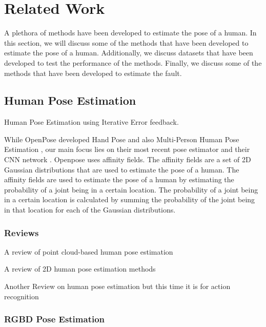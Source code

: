 \section{Related Work}
\label{sec:related_work}

A plethora of methods have been developed to estimate the pose of a human. In this section, we will discuss some of the methods that have been developed to estimate the pose of a human. Additionally, we discuss datasets that have been developed to test the performance of the methods. Finally, we discuss some of the methods that have been developed to estimate the fault.

\subsection{Human Pose Estimation}


Human Pose Estimation using Iterative Error feedback. \cite{IterativeErrorFeedback}

While OpenPose developed Hand Pose\cite{OpenPoseHand} and also Multi-Person Human Pose Estimation \cite{OpenPoseMulti}, our main focus lies on their most recent pose estimator \cite{OpenPosePose} and their CNN network \cite{OpenPoseCNN}. Openpose uses affinity fields. The affinity fields are a set of 2D Gaussian distributions that are used to estimate the pose of a human. The affinity fields are used to estimate the pose of a human by estimating the probability of a joint being in a certain location. The probability of a joint being in a certain location is calculated by summing the probability of the joint being in that location for each of the Gaussian distributions.

\subsubsection{Reviews}


A review of point cloud-based human pose estimation \cite{ReviewPointcloudHPE}

A review of 2D human pose estimation methods \cite{ReviewHPE}

Another Review on human pose estimation but this time it is for action recognition \cite{ReviewHPEforActionRecognition}

\subsubsection{RGBD Pose Estimation}

\cite{PASCUALHERNANDEZ2022102225}

